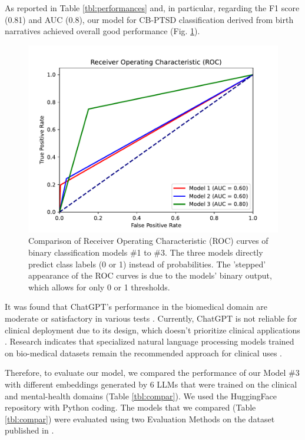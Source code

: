\documentclass[bst/sn-nature]{sn-jnl}%
\theoremstyle{thmstyleone}%
\theoremstyle{thmstyletwo}%
\theoremstyle{thmstylethree}%
\begin{document}
As reported in Table \ref{tbl:performances} and, in particular, regarding the F1 score (0.81) and AUC (0.8), our model for CB-PTSD classification derived from birth narratives achieved overall good performance (Fig. \ref{fig:roc_auc}).


\begin{figure}
    \centering
    \includegraphics[scale=0.8, trim={0cm 0cm 0cm 1.35cm}, clip]{images/roc_curve.pdf}
    \caption{Comparison of Receiver Operating Characteristic (ROC) curves of binary classification models \#1 to \#3.
    The three models directly predict class labels (0 or 1) instead of probabilities. 
    The 'stepped' appearance of the ROC curves is due to the models' binary output, which allows for only 0 or 1 thresholds.
}
    \label{fig:roc_auc}
\end{figure}

It was found that ChatGPT's performance in the biomedical domain are moderate or satisfactory in various tests \cite{li2023chatgpt}.
Currently, ChatGPT is not reliable for clinical deployment due to its design, which doesn't prioritize clinical applications \cite{li2023chatgpt}.
Research indicates that specialized natural language processing models trained on bio-medical datasets remain the recommended approach for clinical uses \cite{li2023chatgpt}.

Therefore, to evaluate our model, we compared the performance of our Model \#3 with different embeddings generated by 6 LLMs that were trained on the clinical and mental-health domains (Table \ref{tbl:compar}).
We used the HuggingFace repository \cite{wolf2019huggingface} with Python coding.
The models that we compared (Table \ref{tbl:compar}) were evaluated using two Evaluation Methods on the dataset published in \cite{bartal2023identifying}.
\end{document}
